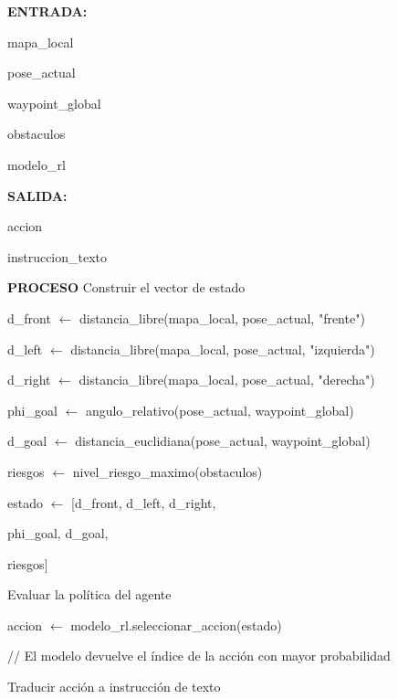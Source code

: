 \begin{algorithmic}[1]

\Statex \textbf{ENTRADA:}

\Statex mapa\_local

\Statex pose\_actual

\Statex waypoint\_global

\Statex obstaculos

\Statex modelo\_rl

\Statex
\Statex \textbf{SALIDA:}

\Statex accion

\Statex instruccion\_texto

\Statex
\Statex \textbf{PROCESO}
\State Construir el vector de estado

\State d\_front $\gets$
distancia\_libre(mapa\_local, pose\_actual, "frente")

\State d\_left $\gets$
distancia\_libre(mapa\_local, pose\_actual, "izquierda")

\State d\_right $\gets$
distancia\_libre(mapa\_local, pose\_actual, "derecha")

\State phi\_goal $\gets$
angulo\_relativo(pose\_actual, waypoint\_global)

\State d\_goal $\gets$
distancia\_euclidiana(pose\_actual, waypoint\_global)

\State riesgos $\gets$
nivel\_riesgo\_maximo(obstaculos)

\Statex

\State estado $\gets$
[d\_front, d\_left, d\_right,

\Statex \hspace{1.3cm}
phi\_goal, d\_goal,

\Statex \hspace{1.3cm}
riesgos]

\Statex
\State Evaluar la política del agente

\State accion $\gets$
modelo\_rl.seleccionar\_accion(estado)

\Statex \hspace{0.5cm}
// El modelo devuelve el índice de la acción con mayor probabilidad

\Statex
\State Traducir acción a instrucción de texto


\end{algorithmic}

